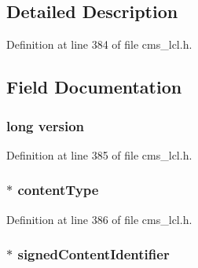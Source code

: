 \subsection{Detailed Description}


Definition at line 384 of file cms\+\_\+lcl.\+h.



\subsection{Field Documentation}
\subsubsection[{\texorpdfstring{version}{version}}]{\setlength{\rightskip}{0pt plus 5cm}long version}\hypertarget{struct_c_m_s___receipt__st_a17afc5cf84cee4b2123665f28ce85c9f}{}\label{struct_c_m_s___receipt__st_a17afc5cf84cee4b2123665f28ce85c9f}


Definition at line 385 of file cms\+\_\+lcl.\+h.

\subsubsection[{\texorpdfstring{content\+Type}{contentType}}]{$\ast$ content\+Type}\hypertarget{struct_c_m_s___receipt__st_af82a0c3993f8e0dc4a321794538ce00d}{}\label{struct_c_m_s___receipt__st_af82a0c3993f8e0dc4a321794538ce00d}


Definition at line 386 of file cms\+\_\+lcl.\+h.

\subsubsection[{\texorpdfstring{signed\+Content\+Identifier}{signedContentIdentifier}}]{$\ast$ signed\+Content\+Identifier}\hypertarget{struct_c_m_s___receipt__st_aee60f8592bd6dfe669df11513f67a74a}{}\label{struct_c_m_s___receipt__st_aee60f8592bd6dfe669df11513f67a74a}


